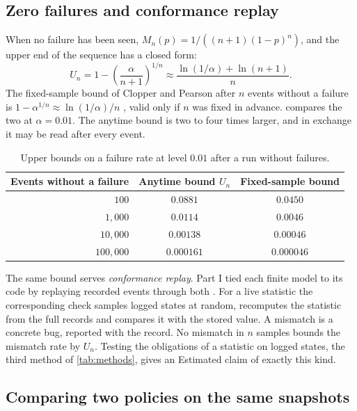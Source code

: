 \documentclass[11pt]{article}
\theoremstyle{definition}
\theoremstyle{plain}
\begin{document}
\subsection{Zero failures and conformance replay}\label{sec:zero}

When no failure has been seen, $M_n(p)=1/((n+1)(1-p)^n)$, and the upper end of the sequence has a
closed form:
\[
U_n=1-\left(\frac{\alpha}{n+1}\right)^{1/n}\approx\frac{\ln(1/\alpha)+\ln(n+1)}{n}.
\]
The fixed-sample bound of Clopper and Pearson after $n$ events without a failure is
$1-\alpha^{1/n}\approx\ln(1/\alpha)/n$ \cite{clopper}, valid only if $n$ was fixed in advance.
 compares the two at $\alpha=0.01$. The anytime bound is two to four times larger,
and in exchange it may be read after every event.

\begin{table}[ht]
\centering\small
\begin{tabular}{rcc}
\toprule
Events without a failure & Anytime bound $U_n$ & Fixed-sample bound\\
\midrule
$100$ & $0.0881$ & $0.0450$\\
$1{,}000$ & $0.0114$ & $0.0046$\\
$10{,}000$ & $0.00138$ & $0.00046$\\
$100{,}000$ & $0.000161$ & $0.000046$\\
\bottomrule
\end{tabular}
\caption{Upper bounds on a failure rate at level $0.01$ after a run without failures.}\label{tab:zero}
\end{table}

The same bound serves \emph{conformance replay}. Part I tied each finite model to its code by
replaying recorded events through both \cite[Section~3.4]{part1}. For a live statistic the
corresponding check samples logged states at random, recomputes the statistic from the full records
and compares it with the stored value. A mismatch is a concrete bug, reported with the record. No
mismatch in $n$ samples bounds the mismatch rate by $U_n$. Testing the obligations of a statistic on
logged states, the third method of \cref{tab:methods}, gives an Estimated claim of exactly this
kind.

\subsection{Comparing two policies on the same snapshots}\label{sec:paired}
\end{document}
